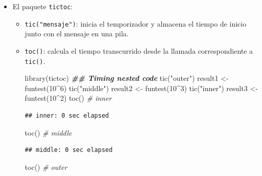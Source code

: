 \documentclass[
]{book}
\newenvironment{Shaded}{\begin{snugshade}}{\end{snugshade}}
\newcommand{\CommentTok}[1]{\textcolor[rgb]{0.56,0.35,0.01}{\textit{#1}}}
\newcommand{\DecValTok}[1]{\textcolor[rgb]{0.00,0.00,0.81}{#1}}
\newcommand{\DocumentationTok}[1]{\textcolor[rgb]{0.56,0.35,0.01}{\textbf{\textit{#1}}}}
\newcommand{\FunctionTok}[1]{\textcolor[rgb]{0.00,0.00,0.00}{#1}}
\newcommand{\NormalTok}[1]{#1}
\newcommand{\OtherTok}[1]{\textcolor[rgb]{0.56,0.35,0.01}{#1}}
\newcommand{\SpecialCharTok}[1]{\textcolor[rgb]{0.00,0.00,0.00}{#1}}
\newcommand{\StringTok}[1]{\textcolor[rgb]{0.31,0.60,0.02}{#1}}
\theoremstyle{break}
\theoremstyle{nonumberplain}
\begin{document}
\begin{itemize}
\item
  El paquete \texttt{tictoc}:

  \begin{itemize}
  \item
    \texttt{tic("mensaje")}: inicia el temporizador y almacena el tiempo de inicio junto con el mensaje en una pila.
  \item
    \texttt{toc()}: calcula el tiempo transcurrido desde la llamada correspondiente a \texttt{tic()}.

\begin{Shaded}
\begin{Highlighting}[]
\FunctionTok{library}\NormalTok{(tictoc)}
\DocumentationTok{\#\# Timing nested code}
\FunctionTok{tic}\NormalTok{(}\StringTok{"outer"}\NormalTok{)}
\NormalTok{   result1 }\OtherTok{\textless{}{-}} \FunctionTok{funtest}\NormalTok{(}\DecValTok{10}\SpecialCharTok{\^{}}\DecValTok{6}\NormalTok{)}
   \FunctionTok{tic}\NormalTok{(}\StringTok{"middle"}\NormalTok{)}
\NormalTok{      result2 }\OtherTok{\textless{}{-}} \FunctionTok{funtest}\NormalTok{(}\DecValTok{10}\SpecialCharTok{\^{}}\DecValTok{3}\NormalTok{)}
      \FunctionTok{tic}\NormalTok{(}\StringTok{"inner"}\NormalTok{)}
\NormalTok{         result3 }\OtherTok{\textless{}{-}} \FunctionTok{funtest}\NormalTok{(}\DecValTok{10}\SpecialCharTok{\^{}}\DecValTok{2}\NormalTok{)}
      \FunctionTok{toc}\NormalTok{() }\CommentTok{\# inner}
\end{Highlighting}
\end{Shaded}

\begin{verbatim}
## inner: 0 sec elapsed
\end{verbatim}

\begin{Shaded}
\begin{Highlighting}[]
   \FunctionTok{toc}\NormalTok{() }\CommentTok{\# middle}
\end{Highlighting}
\end{Shaded}

\begin{verbatim}
## middle: 0 sec elapsed
\end{verbatim}

\begin{Shaded}
\begin{Highlighting}[]
\FunctionTok{toc}\NormalTok{() }\CommentTok{\# outer}
\end{Highlighting}
\end{Shaded}


\end{itemize}
\end{itemize}
\end{document}
